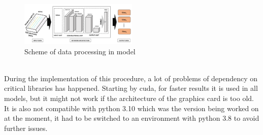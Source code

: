 \begin{figure}[h!]
  \caption{Scheme of data processing in model}
  \centering
  \includegraphics[width=0.5\textwidth]{img/FeatureProjectorModel CHM.png}
\end{figure}
\leavevmode\\
During the implementation of this procedure, a lot of problems of dependency on critical libraries has happened. Starting by cuda, for faster results it is used in all models, but it might not work if the architecture of the graphics card is too old. It is also not compatible with python 3.10 which was the version being worked on at the moment, it had to be switched to an environment with python 3.8 to avoid further issues.
\\